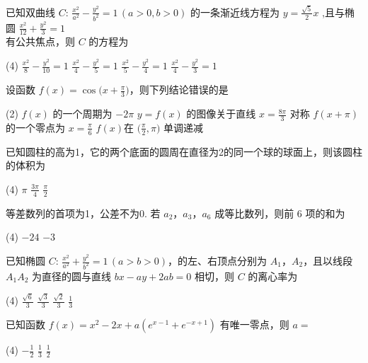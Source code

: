 \begin{question}
已知双曲线 $C\colon\,\frac{x^2}{a^2}-\frac{y^2}{b^2}=1\,(a>0,b>0)$ 的一条渐近线方程为 $y=\frac{\sqrt{5}}{2}x$ ,且与椭圆
	$\frac{x^2}{12}+\frac{y^2}{3}=1$\\ 有公共焦点，则 $C$ 的方程为
	\begin{tasks}(4)
		\task $\frac{x^2}{8}-\frac{y^2}{10}=1$ \task $\frac{x^2}{4}-\frac{y^2}{5}=1$ \task $\frac{x^2}{5}-\frac{y^2}{4}=1$ \task $\frac{x^2}{4}-\frac{y^2}{3}=1$
	\end{tasks}
\end{question}

\begin{question}
设函数 $f(x)=\cos\Big(x+\frac{\pi}{3}\Big)$，则下列结论错误的是
	\begin{tasks}(2)
		\task $f(x)$ 的一个周期为 $-2\pi$ \task $y=f(x)$ 的图像关于直线 $x=\frac{8\pi}{3}$ 对称
		\task $f(x+\pi)$ 的一个零点为 $x=\frac{\pi}{6}$ \task  $f(x)$在 $\Big(\frac{\pi}{2},\pi\Big)$ 单调递减
	\end{tasks}
\end{question}

	
\begin{question}
已知圆柱的高为1，它的两个底面的圆周在直径为2的同一个球的球面上，则该圆柱的体积为
	\begin{tasks}(4)
		\task $\pi$ \task $\frac{3\pi}{4}$ \task $\frac{\pi}{2}$ 
	\end{tasks}
\end{question}


\begin{question}
等差数列的首项为1，公差不为0. 若 $a_2$，$a_3$，$a_6$ 成等比数列，则前 6 项的和为
	\begin{tasks}(4)
		\task $-24$ \task $-3$  
	\end{tasks}
\end{question}

\begin{question}
已知椭圆 $C\colon\,\frac{x^2}{a^2}+\frac{y^2}{b^2}=1\,(a>b>0)$，的左、右顶点分别为 $A_1$，$A_2$，且以线段 $A_1A_2$ 为直径的圆与直线 $bx-ay+2ab=0$ 相切，则 $C$ 的离心率为
	\begin{tasks}(4)
		\task $\frac{\sqrt{6}}{3}$ \task $\frac{\sqrt{3}}{3}$ \task $\frac{\sqrt{2}}{3}$ \task $\frac{1}{3}$
	\end{tasks}
\end{question}


\begin{question}已知函数 $f(x)=x^2-2x+a(e^{x-1}+e^{-x+1})$ 有唯一零点，则 $a=$
	\begin{tasks}(4)
		\task $-\frac{1}{2}$ \task $\frac{1}{3}$ \task $\frac{1}{2}$ 
	\end{tasks}
\end{question}


